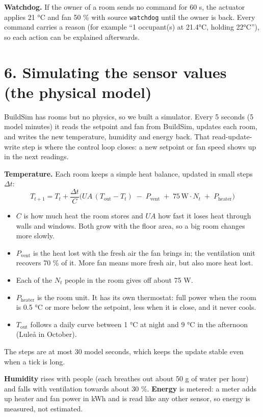 \documentclass[11pt]{article}
\providecommand{\tightlist}{\setlength{\itemsep}{0pt}\setlength{\parskip}{0pt}}
\begin{document}
\textbf{Watchdog.} If the owner of a room sends no command for 60 s, the actuator applies 21 °C
and fan 50 \% with source \texttt{watchdog} until the owner is back. Every command carries a
reason (for example ``1 occupant(s) at 21.4°C, holding 22°C''), so each action can be explained
afterwards.

\section{6. Simulating the sensor values (the physical model)}\label{physics}

BuildSim has rooms but no physics, so we built a simulator. Every 5 seconds (5 model minutes) it
reads the setpoint and fan from BuildSim, updates each room, and writes the new temperature,
humidity and energy back. That read-update-write step is where the control loop closes: a new
setpoint or fan speed shows up in the next readings.

\textbf{Temperature.} Each room keeps a simple heat balance, updated in small steps $\Delta t$:
\[
T_{t+1} = T_t + \frac{\Delta t}{C}\Big(UA\,(T_\text{out} - T_t) \;-\; P_\text{vent} \;+\; 75\,\text{W}\cdot N_t \;+\; P_\text{heater}\Big)
\]
\begin{itemize}
\tightlist
\item $C$ is how much heat the room stores and $UA$ how fast it loses heat through walls and
  windows. Both grow with the floor area, so a big room changes more slowly.
\item $P_\text{vent}$ is the heat lost with the fresh air the fan brings in; the ventilation unit
  recovers 70 \% of it. More fan means more fresh air, but also more heat lost.
\item Each of the $N_t$ people in the room gives off about 75 W.
\item $P_\text{heater}$ is the room unit. It has its own thermostat: full power when the room is
  0.5 °C or more below the setpoint, less when it is close, and it never cools.
\item $T_\text{out}$ follows a daily curve between 1 °C at night and 9 °C in the afternoon
  (Luleå in October).
\end{itemize}
The steps are at most 30 model seconds, which keeps the update stable even when a tick is long.

\textbf{Humidity} rises with people (each breathes out about 50 g of water per hour) and falls with
ventilation towards about 30 \%. \textbf{Energy} is metered: a meter adds up heater and fan power in
kWh and is read like any other sensor, so energy is measured, not estimated.
\end{document}
